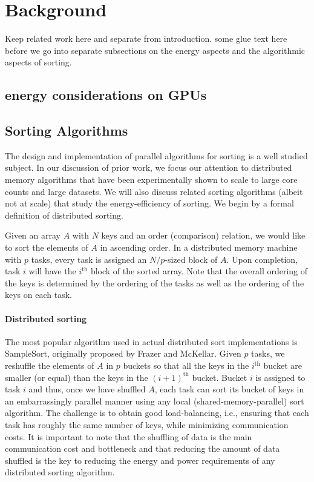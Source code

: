 \section{Background}
Keep related work here and separate from introduction. some glue text here before we go into separate subsections on the energy aspects and the algorithmic aspects of sorting.

\subsection{energy considerations on GPUs}


\subsection{Sorting Algorithms}
\label{sec:bg-dist}

The design and implementation of parallel algorithms for sorting is a well studied subject. In our discussion of prior work, we focus our attention to distributed memory algorithms that have been experimentally shown to scale to large core counts and large datasets. We will also discuss related sorting algorithms (albeit not at scale) that study the energy-efficiency of sorting. We begin by a formal definition of distributed sorting.

Given an array $A$ with $N$ keys and an order (comparison) relation, we would like to sort the elements of $A$ in ascending order. In a distributed memory machine with $p$ tasks, every task is assigned an $N/p$-sized block of $A$. Upon completion, task $i$ will have the $i^{\text{th}}$ block of the sorted array. Note that the overall ordering of the keys is determined by the ordering of the tasks as well as the ordering of the keys on each task.  

\paragraph{Distributed sorting}

The most popular algorithm used in actual distributed
sort implementations is SampleSort, originally proposed by Frazer and McKellar\cite{samplesort}. Given $p$ tasks, we
reshuffle the elements of $A$ in $p$ buckets so that all the
keys in the $i^\text{th}$ bucket are smaller (or equal) than the keys in
the $(i+1)^\text{th}$ bucket. Bucket $i$ is assigned to task $i$ and thus,
once we have shuffled $A$, each task can sort its bucket of
keys in an embarrassingly parallel manner using any local
(shared-memory-parallel) sort algorithm. The challenge is to obtain good load-balancing, i.e., ensuring that each task  has roughly the same number of keys, while minimizing communication costs.  It is important to note that the shuffling of data is the main communication cost and bottleneck and that reducing the amount of data shuffled is the key to reducing the energy and power requirements of any distributed sorting algorithm.    

